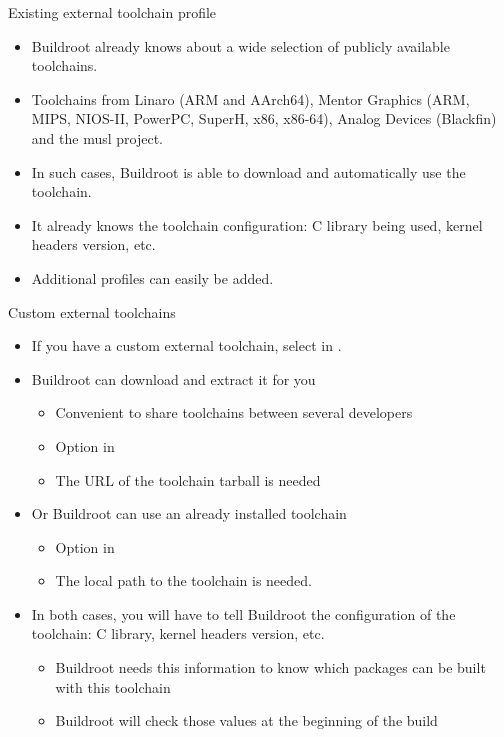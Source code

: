 \begin{frame}{Existing external toolchain profile}
  \begin{itemize}
  \item Buildroot already knows about a wide selection of publicly
    available toolchains.
  \item Toolchains from Linaro (ARM and AArch64), Mentor Graphics
    (ARM, MIPS, NIOS-II, PowerPC, SuperH, x86, x86-64), Analog Devices
    (Blackfin) and the musl project.
  \item In such cases, Buildroot is able to download and automatically
    use the toolchain.
  \item It already knows the toolchain configuration: C library being
    used, kernel headers version, etc.
  \item Additional profiles can easily be added.
  \end{itemize}
\end{frame}

\begin{frame}{Custom external toolchains}
  \begin{itemize}
  \item If you have a custom external toolchain, select  in .
  \item Buildroot can download and extract it for you
    \begin{itemize}
    \item Convenient to share toolchains between several
      developers
    \item Option  in 
    \item The URL of the toolchain tarball is needed
    \end{itemize}
  \item Or Buildroot can use an already installed toolchain
    \begin{itemize}
    \item Option  in 
    \item The local path to the toolchain is needed.
    \end{itemize}
  \item In both cases, you will have to tell Buildroot the
    configuration of the toolchain: C library, kernel headers version,
    etc.
    \begin{itemize}
    \item Buildroot needs this information to know which packages can
      be built with this toolchain
    \item Buildroot will check those values at the beginning of the
      build
    \end{itemize}
  \end{itemize}
\end{frame}

